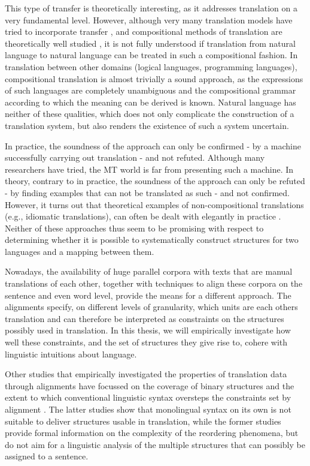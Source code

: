 \documentclass[a4paper, 11pt]{report}
\theoremstyle{definition}
\theoremstyle{plain}
\begin{document}
This type of transfer is theoretically interesting, as it addresses translation on a very fundamental level. However, although very many translation models have tried to incorporate transfer \citep[e.g.,][]{wu1997stochastic,chiang2005hierarchical}, and compositional methods of translation are theoretically well studied \citep[e.g.,][]{janssen1996compositionality}, it is not fully understood if translation from natural language to natural language can be treated in such a compositional fashion. In translation between other domains (logical languages, programming languages), compositional translation is almost trivially a sound approach, as the expressions of such languages are completely unambiguous and the compositional grammar according to which the meaning can be derived is known. Natural language has neither of these qualities, which does not only complicate the construction of a translation system, but also renders the existence of such a system uncertain.

In practice, the soundness of the approach can only be confirmed - by a machine successfully carrying out translation - and not refuted. Although many researchers have tried, the MT world is far from presenting such a machine. In theory, contrary to in practice, the soundness of the approach can only be refuted - by finding examples that can not be translated as such - and not confirmed. However, it turns out that theoretical examples of non-compositional translations (e.g., idiomatic translations), can often be dealt with elegantly in practice \citep{janssen1996compositionality}. Neither of these approaches thus seem to be promising with respect to determining whether it is possible to systematically construct structures for two languages and a mapping between them.

Nowadays, the availability of huge parallel corpora with texts that are manual translations of each other, together with techniques to align these corpora on the sentence and even word level, provide the means for a different approach. The alignments specify, on different levels of granularity, which units are each others translation and can therefore be interpreted as constraints on the structures possibly used in translation. In this thesis, we will empirically investigate how well these constraints, and the set of structures they give rise to, cohere with linguistic intuitions about language.

Other studies that empirically investigated the properties of translation data through alignments have focussed on the coverage of binary structures \citep[e.g.,][]{sogaard2009empirical1} and the extent to which conventional linguistic syntax oversteps the constraints set by alignment \citep[e.g.,][]{fox2002phrasal,hwa2002evaluating}. The latter studies show that monolingual syntax on its own is not suitable to deliver structures usable in translation, while the former studies provide formal information on the complexity of the reordering phenomena, but do not aim for a linguistic analysis of the multiple structures that can possibly be assigned to a sentence. 
\end{document}
